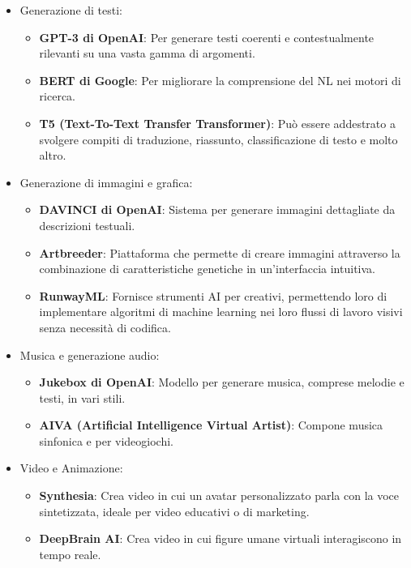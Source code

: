         \begin{itemize}
            \item Generazione di testi:
            \begin{itemize}
                \item \textbf{GPT-3 di OpenAI}: Per generare testi coerenti e contestualmente rilevanti su una vasta gamma di argomenti.
                \item \textbf{BERT di Google}: Per migliorare la comprensione del NL nei motori di ricerca.
                \item \textbf{T5 (Text-To-Text Transfer Transformer)}: Può essere addestrato a svolgere compiti di traduzione, riassunto, classificazione di testo e molto altro.
            \end{itemize}
            \item Generazione di immagini e grafica:
            \begin{itemize}
                \item \textbf{DAVINCI di OpenAI}: Sistema per generare immagini dettagliate da descrizioni testuali.
                \item \textbf{Artbreeder}: Piattaforma che permette di creare immagini attraverso la combinazione di caratteristiche genetiche in un'interfaccia intuitiva.
                \item \textbf{RunwayML}: Fornisce strumenti AI per creativi, permettendo loro di implementare algoritmi di machine learning nei loro flussi di lavoro visivi senza necessità di codifica.
            \end{itemize}
            \item Musica e generazione audio:
            \begin{itemize}
                \item \textbf{Jukebox di OpenAI}: Modello per generare musica, comprese melodie e testi, in vari stili.
                \item \textbf{AIVA (Artificial Intelligence Virtual Artist)}: Compone musica sinfonica e per videogiochi.
            \end{itemize}
            \item Video e Animazione:
            \begin{itemize}
                \item \textbf{Synthesia}: Crea video in cui un avatar personalizzato parla con la voce sintetizzata, ideale per video educativi o di marketing.
                \item \textbf{DeepBrain AI}: Crea video in cui figure umane virtuali interagiscono in tempo reale.

\end{itemize}
\end{itemize}
